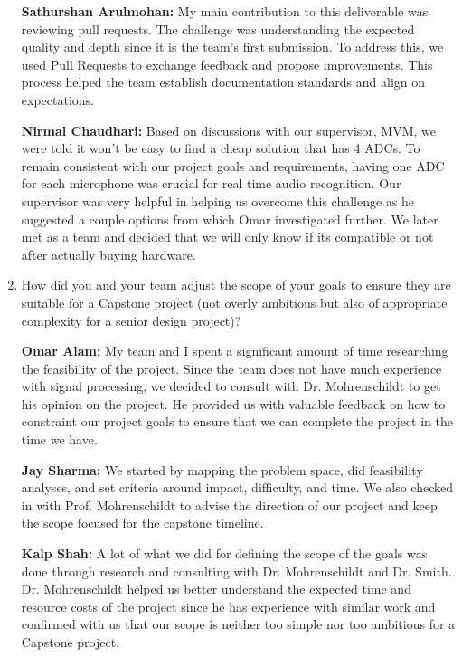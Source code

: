 \documentclass{article}
\begin{document}
\begin{enumerate}
    \textbf{Sathurshan Arulmohan:} My main contribution to this deliverable was
    reviewing pull requests. The challenge was understanding the expected
    quality and depth since it is the team's first submission. To address this,
    we used Pull Requests to exchange feedback and propose improvements. This
    process helped the team establish documentation standards and align on
    expectations.

    \textbf{Nirmal Chaudhari:} Based on discussions with our supervisor, MVM, we
    were told it won't be easy to find a cheap solution that has 4 ADCs. To
    remain consistent with our project goals and requirements, having one ADC
    for each microphone was crucial for real time audio recognition. Our
    supervisor was very helpful in helping us overcome this challenge as he
    suggested a couple options from which Omar investigated further. We later
    met as a team and decided that we will only know if its compatible or not
    after actually buying hardware. 

    \item How did you and your team adjust the scope of your goals to ensure
    they are suitable for a Capstone project (not overly ambitious but also of
    appropriate complexity for a senior design project)?

    \textbf{Omar Alam:} My team and I spent a significant amount of time
    researching the feasibility of the project. Since the team does not have
    much experience with signal processing, we decided to consult with Dr.
    Mohrenschildt to get his opinion on the project. He provided us with
    valuable feedback on how to constraint our project goals to ensure that we
    can complete the project in the time we have.
    
    \textbf{Jay Sharma:} We started by mapping the problem space, did
    feasibility analyses, and set criteria around impact, difficulty, and time.
    We also checked in with Prof. Mohrenschildt to advise the direction of our
    project and keep the scope focused for the capstone timeline.

    \textbf{Kalp Shah:} A lot of what we did for defining the scope of the goals
    was done through research and consulting with Dr. Mohrenschildt and Dr.
    Smith. Dr. Mohrenschildt helped us better understand the expected time and
    resource costs of the project since he has experience with similar work and
    confirmed with us that our scope is neither too simple nor too ambitious for
    a Capstone project.


\end{enumerate}
\end{document}
